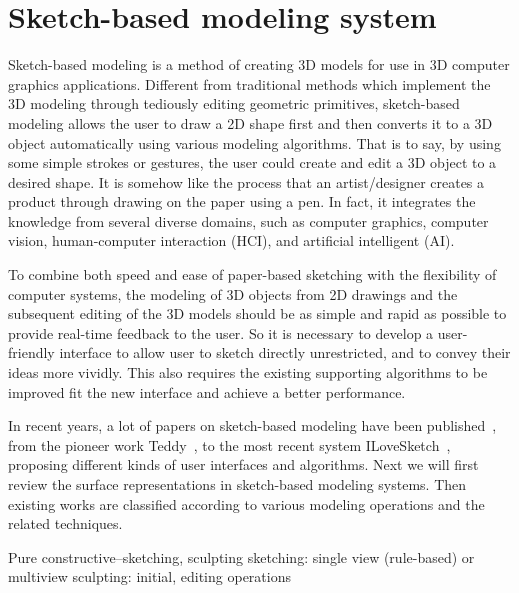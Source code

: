 \section{Sketch-based modeling system}\label{ch2:sec:sbim}

Sketch-based modeling is a method of creating 3D models for use in 3D computer graphics applications. Different from traditional methods which implement the 3D modeling through tediously editing geometric primitives, sketch-based modeling allows the user to draw a 2D shape first and then converts it to a 3D object automatically using various modeling algorithms. That is to say, by using some simple strokes or gestures, the user could create and edit a 3D object to a desired shape. It is somehow like the process that an artist/designer creates a product through drawing on the paper using a pen. In fact, it integrates the knowledge from several diverse domains, such as computer graphics, computer vision, human-computer interaction (HCI), and artificial intelligent (AI).

To combine both speed and ease of paper-based sketching with the flexibility of computer systems, the modeling of 3D objects from 2D drawings and the subsequent editing of the 3D models should be as simple and rapid as possible to provide real-time feedback to the user. So it is necessary to develop a user-friendly interface to allow user to sketch directly unrestricted, and to convey their ideas more vividly. This also requires the existing supporting algorithms to be improved fit the new interface and achieve a better performance.

In recent years, a lot of papers on sketch-based modeling have been published~\cite{OSSJ09}, from the pioneer work Teddy~\cite{IMT99}, to the most recent system ILoveSketch~\cite{BBS08}, proposing different kinds of user interfaces and algorithms. Next we will first review the surface representations in sketch-based modeling systems. Then existing works are classified according to various modeling operations and the related techniques.











Pure constructive--sketching, sculpting
sketching: single view (rule-based) or multiview
sculpting: initial, editing operations

